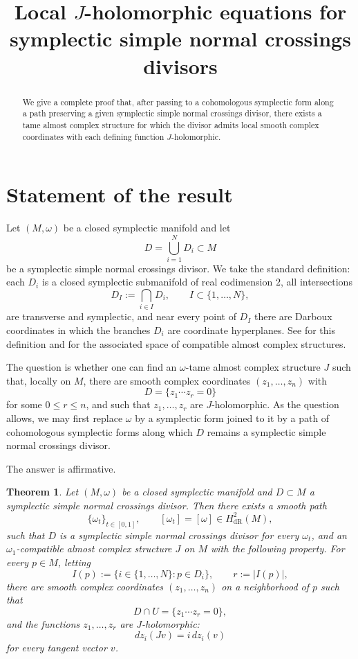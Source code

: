 \documentclass[11pt]{article}
\title{Local $J$-holomorphic equations for symplectic simple normal crossings divisors}
\author{}
\date{}
\newtheorem{theorem}{Theorem}
\theoremstyle{remark}
\begin{document}
\maketitle

\begin{abstract}
We give a complete proof that, after passing to a cohomologous symplectic form along a path preserving a given symplectic simple normal crossings divisor, there exists a tame almost complex structure for which the divisor admits local smooth complex coordinates with each defining function $J$-holomorphic.
\end{abstract}

\section{Statement of the result}

Let $(M,\omega)$ be a closed symplectic manifold and let
\[
D=\bigcup_{i=1}^{N}D_i\subset M
\]
be a symplectic simple normal crossings divisor. We take the standard definition: each $D_i$ is a closed symplectic submanifold of real codimension $2$, all intersections
\[
D_I:=\bigcap_{i\in I}D_i,\qquad I\subset \{1,\dots,N\},
\]
are transverse and symplectic, and near every point of $D_I$ there are Darboux coordinates in which the branches $D_i$ are coordinate hyperplanes. See \cite{FZ17} for this definition and for the associated space of compatible almost complex structures.

The question is whether one can find an $\omega$-tame almost complex structure $J$ such that, locally on $M$, there are smooth complex coordinates $(z_1,\dots,z_n)$ with
\[
D=\{z_1\cdots z_r=0\}
\]
for some $0\le r\le n$, and such that $z_1,\dots,z_r$ are $J$-holomorphic. As the question allows, we may first replace $\omega$ by a symplectic form joined to it by a path of cohomologous symplectic forms along which $D$ remains a symplectic simple normal crossings divisor.

The answer is affirmative.

\begin{theorem}\label{thm:main}
Let $(M,\omega)$ be a closed symplectic manifold and $D\subset M$ a symplectic simple normal crossings divisor. Then there exists a smooth path
\[
\{\omega_t\}_{t\in[0,1]},\qquad [\omega_t]=[\omega]\in H^2_{\mathrm{dR}}(M),
\]
such that $D$ is a symplectic simple normal crossings divisor for every $\omega_t$, and an $\omega_1$-compatible almost complex structure $J$ on $M$ with the following property. For every $p\in M$, letting
\[
I(p):=\{i\in\{1,\dots,N\}:p\in D_i\},\qquad r:=|I(p)|,
\]
there are smooth complex coordinates $(z_1,\dots,z_n)$ on a neighborhood of $p$ such that
\[
D\cap U=\{z_1\cdots z_r=0\},
\]
and the functions $z_1,\dots,z_r$ are $J$-holomorphic:
\[
dz_i(Jv)=i\,dz_i(v)
\]
for every tangent vector $v$.
\end{theorem}
\end{document}
